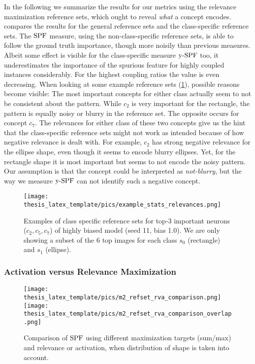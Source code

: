 In the following we summarize the results for our metrics using the relevance maximization reference sets, which ought to reveal \textit{what} a concept encodes.  compares the results for the general reference sets and the class-specific reference sets. 
The $\operatorname*{SPF}$ measure, using the non-class-specific reference sets, is able to follow the ground truth importance, though more noisily than previous measures. 
Albeit some effect is visible for the class-specific measure $\operatorname*{y-SPF}$ too, it underestimates the importance of the spurious feature for highly coupled instances considerably. For the highest coupling ratios the value is even decreasing. 
When looking at some example reference sets (\cref{fig:class_reference_sets}), possible reasons become visible: The most important concepts for either class actually seem to not be consistent about the pattern. While $c_2$ is very important for the rectangle, the pattern is equally noisy or blurry in the reference set. The opposite occurs for concept $c_7$. The relevances for either class of these two concepts give us the hint that the class-specific reference sets might not work as intended because of how negative relevance is dealt with. For example, $c_2$ has strong negative relevance for the ellipse shape, even though it seems to encode blurry ellipses. Yet, for the rectangle shape it is most important but seems to not encode the noisy pattern. Our assumption is that the concept could be interpreted as \textit{not-blurry}, but the way we measure $\operatorname*{y-SPF}$ can not identify such a negative concept.

\begin{figure}[t!]
    \centering
    \texttt{[image: thesis\_latex\_template/pics/example\_stats\_relevances.png]}
    \caption[Examples of Class-Specific Reference Sets]{Examples of class specific reference sets for top-3 important neurons ($c_2, c_5, c_7$) of highly biased model (seed 11, bias 1.0). We are only showing a subset of the 6 top images for each class $s_0$ (rectangle) and $s_1$ (ellipse).}
    \label{fig:class_reference_sets}
\end{figure}

\subsubsection{Activation versus Relevance Maximization}
\begin{figure}[ht!]
    \centering
    \texttt{[image: thesis\_latex\_template/pics/m2\_refset\_rva\_comparison.png]}
    \texttt{[image: thesis\_latex\_template/pics/m2\_refset\_rva\_comparison\_overlap.png]}
    \caption[Relevance vs. Activation Maximization, Sum vs. Max Target]{
    Comparison of $\operatorname*{SPF}$ using different maximization targets (sum/max) and relevance or activation, when distribution of shape is taken into account.
    }
    \label{fig:m2_refset_rel_vs_act}
\end{figure}

